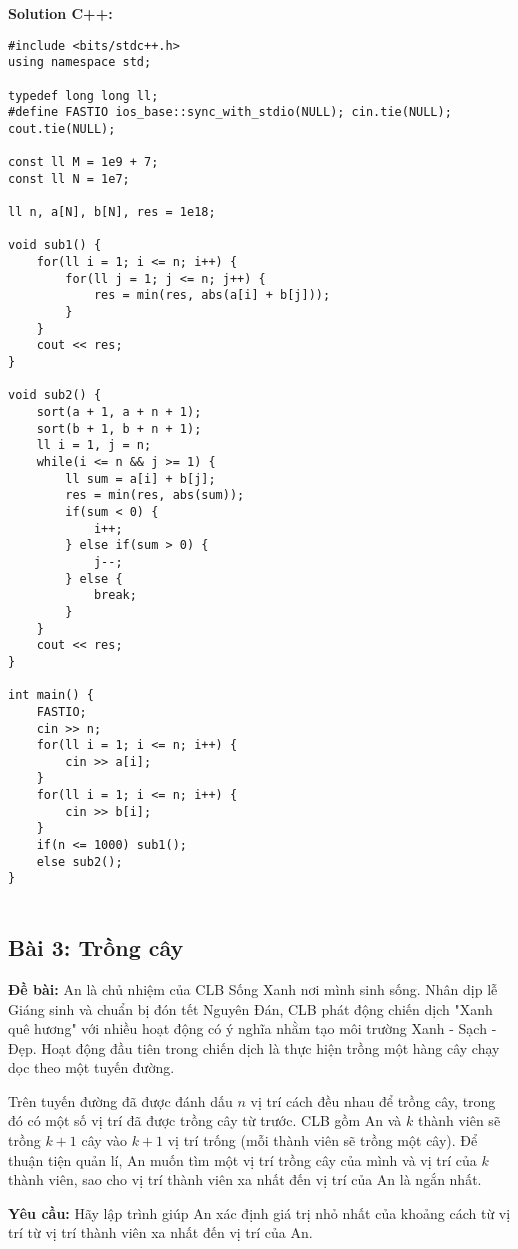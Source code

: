 \documentclass[12pt]{scrartcl}  %
\begin{document}
\textbf{Solution C++:}
\begin{lstlisting}
#include <bits/stdc++.h>
using namespace std;

typedef long long ll;
#define FASTIO ios_base::sync_with_stdio(NULL); cin.tie(NULL); cout.tie(NULL);

const ll M = 1e9 + 7;
const ll N = 1e7;

ll n, a[N], b[N], res = 1e18;

void sub1() {
    for(ll i = 1; i <= n; i++) {
        for(ll j = 1; j <= n; j++) {
            res = min(res, abs(a[i] + b[j]));
        }
    }
    cout << res;
}

void sub2() {
    sort(a + 1, a + n + 1);
    sort(b + 1, b + n + 1);
    ll i = 1, j = n;
    while(i <= n && j >= 1) {
        ll sum = a[i] + b[j];
        res = min(res, abs(sum));
        if(sum < 0) {
            i++;
        } else if(sum > 0) {
            j--;
        } else {
            break;
        }
    }
    cout << res;
}

int main() {
    FASTIO;
    cin >> n;
    for(ll i = 1; i <= n; i++) {
        cin >> a[i];
    }
    for(ll i = 1; i <= n; i++) {
        cin >> b[i];
    }
    if(n <= 1000) sub1();
    else sub2();
}


\end{lstlisting}

\subsection{Bài 3: Trồng cây}

\textbf{Đề bài:}
An là chủ nhiệm của CLB Sống Xanh nơi mình sinh sống. Nhân dịp lễ Giáng sinh và chuẩn bị đón tết Nguyên Đán, CLB phát động chiến dịch "Xanh quê hương"
với nhiều hoạt động có ý nghĩa nhằm tạo môi trường Xanh - Sạch - Đẹp. Hoạt động đầu tiên trong chiến dịch là thực hiện trồng một hàng cây chạy dọc theo 
một tuyến đường. 

Trên tuyến đường đã được đánh dấu $n$ vị trí cách đều nhau để trồng cây, trong đó có một số vị trí đã được trồng cây từ trước. CLB gồm An và $k$ thành viên sẽ trồng $k + 1$ 
cây vào $k + 1$ vị trí trống (mỗi thành viên sẽ trồng một cây). Để thuận tiện quản lí, An muốn tìm một vị trí trồng cây của mình và vị trí của $k$ thành viên, sao cho vị trí thành viên xa nhất đến vị trí của An là ngắn nhất.

\textbf{Yêu cầu:}
Hãy lập trình giúp An xác định giá trị nhỏ nhất của khoảng cách từ vị trí từ vị trí thành viên xa nhất đến vị trí của An.
\end{document}

